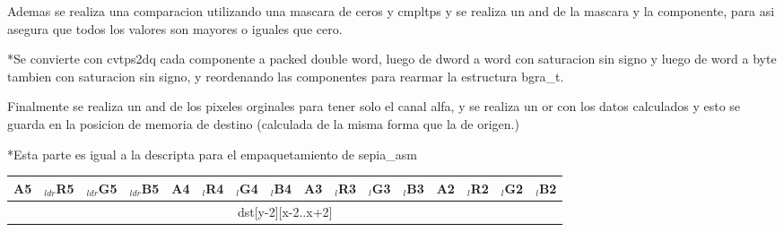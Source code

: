Ademas se realiza una comparacion utilizando una mascara de ceros y cmpltps y se realiza un and de la mascara y la componente, para asi asegura que todos los valores son mayores o iguales que cero.

*Se convierte con cvtps2dq cada componente a packed double word, luego de dword a word con saturacion sin signo y luego de word a byte tambien con saturacion sin signo, y reordenando las componentes para rearmar la estructura bgra_t.

Finalmente se realiza un and de los pixeles orginales para tener solo el canal alfa, y se realiza un or con los datos calculados y esto se guarda en la posicion de memoria de destino (calculada de la misma forma que la de origen.) 
\begin{footnotesize}
*Esta parte es igual a la descripta para el empaquetamiento de sepia_asm
\end{footnotesize}


\begin{table}[!htbp]
	\centering
	\footnotesize
	\begin{tabular}{| c | c | c | c | c | c | c | c | c | c | c | c | c | c | c | c |}
		\hline
		A5 & $_{ldr}$R5 & $_{ldr}$G5 & $_{ldr}$B5 & A4 & $_{l}$R4 & $_{l}$G4 & $_{l}$B4 & A3 & $_{l}$R3 & $_{l}$G3 & $_{l}$B3 & A2 & $_{l}$R2 & $_{l}$G2 & $_{l}$B2  \\ \hline
		\multicolumn{16}{c}{ dst[y-2][x-2..x+2] } \\
	\end{tabular}
\end{table}

